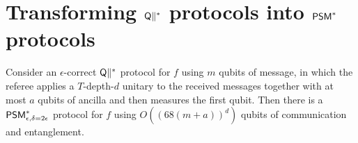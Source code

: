 \section{Transforming $\mathsf{Q}\|^{*}$ protocols into $\mathsf{PSM}^{*}$ protocols}

\begin{theorem}
  \label{thm:q-to-psm}
  Consider an $\epsilon$-correct $\mathsf{Q}\|^{*}$ protocol for $f$ using $m$ qubits of
  message, in which the referee applies a $T$-depth-$d$ unitary to the received
  messages together with at most $a$ qubits of ancilla and then measures the
  first qubit. Then there is a $\mathsf{PSM}^{*}_{\epsilon,\delta=2\epsilon}$ protocol for $f$
  using $O((68(m+a))^d)$ qubits of communication and entanglement.
\end{theorem}
